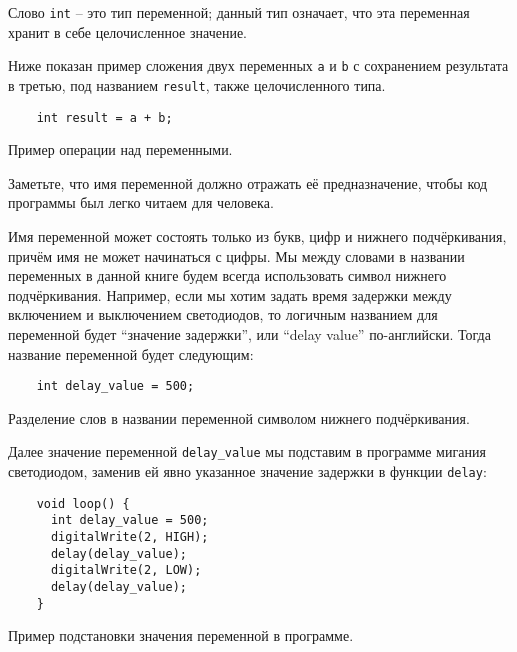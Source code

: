 \documentclass[../sparc.tex]{subfiles}
\begin{document}
Слово \texttt{int} -- это тип переменной; данный тип означает, что эта переменная
хранит в себе целочисленное значение.

Ниже показан пример сложения двух переменных \texttt{a} и \texttt{b} с
сохранением результата в третью, под названием \texttt{result}, также
целочисленного типа.

\begin{listing}[ht]
  \begin{verbatim}
    int result = a + b;
  \end{verbatim}
  \label{listing:dialogues-with-computer-variable-operations-example}
  \caption{Пример операции над переменными.}
\end{listing}

Заметьте, что имя переменной должно отражать её предназначение, чтобы код
программы был легко читаем для человека.

Имя переменной может состоять только из букв, цифр и нижнего подчёркивания,
причём имя не может начинаться с цифры.  Мы между словами в названии переменных
в данной книге будем всегда использовать символ нижнего подчёркивания.
Например, если мы хотим задать время задержки между включением и выключением
светодиодов, то логичным названием для переменной будет ``значение задержки'',
или ``delay value'' по-английски.  Тогда название переменной будет следующим:

\begin{listing}[ht]
  \begin{verbatim}
    int delay_value = 500;
  \end{verbatim}
  \label{listing:dialogues-with-computer-variable-names}
  \caption{Разделение слов в названии переменной символом нижнего
    подчёркивания.}
\end{listing}

Далее значение переменной \texttt{delay\_value} мы подставим в программе мигания
светодиодом, заменив ей явно указанное значение задержки в функции
\texttt{delay}:

\begin{listing}[ht]
  \begin{verbatim}
    void loop() {
      int delay_value = 500;
      digitalWrite(2, HIGH);
      delay(delay_value);
      digitalWrite(2, LOW);
      delay(delay_value);
    }
  \end{verbatim}
  \label{listing:dialogues-with-computer-variable-usage}
  \caption{Пример подстановки значения переменной в программе.}
\end{listing}
\end{document}
